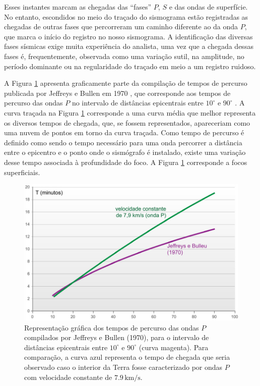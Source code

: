 \documentclass[]{book}
\theoremstyle{definition}
\theoremstyle{definition}
\theoremstyle{definition}
\theoremstyle{remark}
\begin{document}
Esses instantes marcam as chegadas das ``fases'' \(P\), \(S\) e das ondas de superfície. No entanto, escondidos no meio do traçado do sismograma estão registradas as chegadas de outras fases que percorreram um caminho diferente ao da onda \(P\), que marca o início do registro no nosso sismograma. A
identificação das diversas fases sísmicas exige muita experiência do analista, uma vez que a chegada dessas fases é, frequentemente, observada como uma variação sutil, na amplitude, no período dominante ou na regularidade do traçado em meio a um registro ruidoso.

A Figura \ref{fig:usp0412} apresenta graficamente parte da compilação de tempos de percurso publicada por Jeffreys e Bullen em 1970 , que corresponde aos tempos de percurso das ondas \(P\) no intervalo de distâncias epicentrais entre \(10^\circ\) e \(90^\circ\) . A curva traçada na Figura \ref{fig:usp0412} corresponde a uma curva média que melhor representa os diversos tempos de chegada, que, se fossem representados, apareceriam como uma nuvem de pontos em torno da curva traçada. Como tempo de percurso é definido como sendo o tempo necessário para uma onda percorrer a distância entre o epicentro e o ponto onde o sismógrafo é instalado, existe uma variação desse tempo associada à profundidade do foco. A Figura \ref{fig:usp0412} corresponde a focos superficiais.

\begin{figure}

{\centering \includegraphics[width=0.5\linewidth]{fig/figU12} 

}

\caption{Representação gráfica dos tempos de percurso das ondas $P$ compilados por Jeffreys e Bullen (1970), para o intervalo de distâncias epicentrais entre $10^\circ$ e $90^\circ$ (curva magenta). Para comparação, a curva azul representa o tempo de chegada que seria observado caso o interior da Terra fosse caracterizado por ondas $P$ com velocidade constante de $7.9\,\mathrm{km/s}$.}\label{fig:usp0412}
\end{figure}
\end{document}
